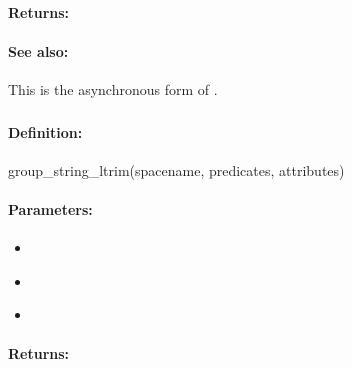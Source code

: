 \paragraph{Returns:}


\paragraph{See also:}  This is the asynchronous form of .

\pagebreak
\subsubsection{}
\label{api:ruby:group_string_ltrim}


\paragraph{Definition:}
\begin{rubycode}
group_string_ltrim(spacename, predicates, attributes)
\end{rubycode}

\paragraph{Parameters:}
\begin{itemize}[noitemsep]
\item {}\\

\item {}\\

\item {}\\

\end{itemize}

\paragraph{Returns:}


\pagebreak
\subsubsection{}
\label{api:ruby:async_group_string_ltrim}


